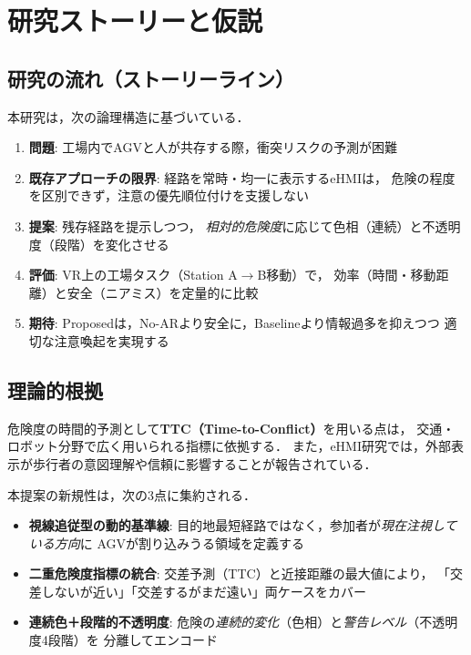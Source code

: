 \section{研究ストーリーと仮説}
\label{sec:story}

\subsection{研究の流れ（ストーリーライン）}

本研究は，次の論理構造に基づいている．

\begin{enumerate}[leftmargin=2em]
  \item \textbf{問題}: 工場内でAGVと人が共存する際，衝突リスクの予測が困難
  \item \textbf{既存アプローチの限界}: 経路を常時・均一に表示するeHMIは，
        危険の程度を区別できず，注意の優先順位付けを支援しない
  \item \textbf{提案}: 残存経路を提示しつつ，
        \emph{相対的危険度}に応じて色相（連続）と不透明度（段階）を変化させる
  \item \textbf{評価}: VR上の工場タスク（Station A$\rightarrow$B移動）で，
        効率（時間・移動距離）と安全（ニアミス）を定量的に比較
  \item \textbf{期待}: Proposedは，No-ARより安全に，Baselineより情報過多を抑えつつ
        適切な注意喚起を実現する
\end{enumerate}

\subsection{理論的根拠}

危険度の時間的予測として\textbf{TTC（Time-to-Conflict）}を用いる点は，
交通・ロボット分野で広く用いられる指標に依拠する\cite{markkula2020}．
また，eHMI研究では，外部表示が歩行者の意図理解や信頼に影響することが報告されている\cite{francis2020eHMI,matthiesen2021survey}．

本提案の新規性は，次の3点に集約される．

\begin{itemize}[leftmargin=2em]
  \item \textbf{視線追従型の動的基準線}:
        目的地最短経路ではなく，参加者が\emph{現在注視している方向}に
        AGVが割り込みうる領域を定義する
  \item \textbf{二重危険度指標の統合}:
        交差予測（TTC）と近接距離の最大値により，
        「交差しないが近い」「交差するがまだ遠い」両ケースをカバー
  \item \textbf{連続色＋段階的不透明度}:
        危険の\emph{連続的変化}（色相）と\emph{警告レベル}（不透明度4段階）を
        分離してエンコード
\end{itemize}

